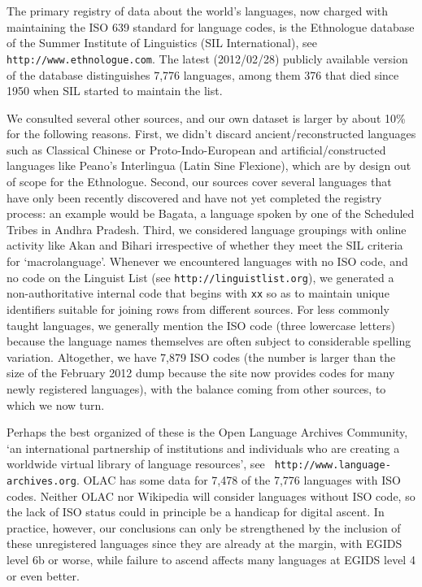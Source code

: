 \documentclass[10pt]{article}
\begin{document}
The primary registry of data about the world's languages, now charged with
maintaining the ISO 639 standard for language codes, is the Ethnologue
database of the Summer Institute of Linguistics (SIL International), see {\tt
  http://www.ethnologue.com}. The latest (2012/02/28) publicly available
version of the database distinguishes 7,776 languages, among them 376 that
died since 1950 when SIL started to maintain the list.

We consulted several other sources, and our own dataset is larger by about
10\% for the following reasons. First, we didn't discard ancient/reconstructed
languages such as Classical Chinese or Proto-Indo-European and
artificial/constructed languages like Peano's Interlingua (Latin Sine
Flexione), which are by design out of scope for the Ethnologue. Second, our
sources cover several languages that have only been recently discovered and
have not yet completed the registry process: an example would be Bagata, a
language spoken by one of the Scheduled Tribes in Andhra Pradesh. Third, we
considered language groupings with online activity like Akan and Bihari
irrespective of whether they meet the SIL criteria for `macrolanguage'.
Whenever we encountered languages with no ISO code, and no code on the
Linguist List (see {\tt http://linguistlist.org}), we generated a
non-authoritative internal code that begins with {\tt xx} so as to maintain
unique identifiers suitable for joining rows from different sources. For less
commonly taught languages, we generally mention the ISO code (three lowercase
letters) because the language names themselves are often subject to
considerable spelling variation.  Altogether, we have 7,879 ISO codes (the
number is larger than the size of the February 2012 dump because the site now
provides codes for many newly registered languages), with the balance coming
from other sources, to which we now turn.

Perhaps the best organized of these is the Open Language Archives Community,
`an international partnership of institutions and individuals who are creating
a worldwide virtual library of language resources', see {\tt
  http://www.language-archives.org}. OLAC has some data for 7,478 of the 7,776
languages with ISO codes.  Neither OLAC nor Wikipedia will consider languages
without ISO code, so the lack of ISO status could in principle be a handicap
{\color{black} for digital ascent}. In practice, however, our conclusions can
only be strengthened by the inclusion of these unregistered languages since
they are already at the margin, with EGIDS level 6b or worse, while
{\color{black} failure to ascend} affects many languages at EGIDS level 4 or
even better.
\end{document}
